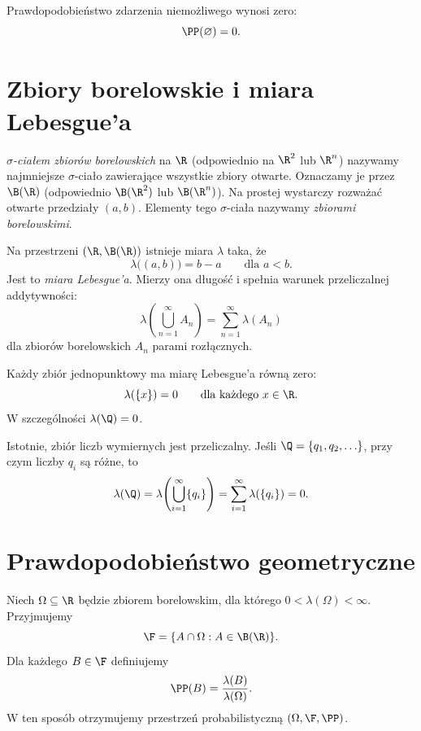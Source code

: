 \begin{fakt}
\label{fakt:pusty}
Prawdopodobieństwo zdarzenia niemożliwego wynosi zero:
\[
  \PP(\varnothing)=0.
\]
\end{fakt}

\section{Zbiory borelowskie i miara Lebesgue'a}
\label{sec:borel}

\begin{definicja}
\emph{$\sigma$-ciałem zbiorów borelowskich} na $\R$
(odpowiednio na $\R^2$ lub $\R^n$) nazywamy najmniejsze
$\sigma$-ciało zawierające wszystkie zbiory otwarte.
Oznaczamy je przez $\B(\R)$ (odpowiednio $\B(\R^2)$ lub $\B(\R^n)$).
Na prostej wystarczy rozważać otwarte przedziały $(a,b)$.
Elementy tego $\sigma$-ciała nazywamy \emph{zbiorami borelowskimi}.
\end{definicja}

Na przestrzeni $(\R,\B(\R))$ istnieje miara $\lambda$ taka, że
\[
  \lambda\bigl((a,b)\bigr)=b-a
  \qquad\text{dla }a<b.
\]
Jest to \emph{miara Lebesgue'a}. Mierzy ona długość i spełnia
warunek przeliczalnej addytywności:
\[
  \lambda\!\left(\bigcup_{n=1}^{\infty}A_n\right)
    =\sum_{n=1}^{\infty}\lambda(A_n)
\]
dla zbiorów borelowskich $A_n$ parami rozłącznych.

\begin{fakt}
\label{fakt:miara-zero}
Każdy zbiór jednopunktowy ma miarę Lebesgue'a równą zero:
\[
  \lambda(\{x\})=0\qquad\text{dla każdego }x\in\R.
\]
W szczególności $\lambda(\Q)=0$.
\end{fakt}

Istotnie, zbiór liczb wymiernych jest przeliczalny. Jeśli
$\Q=\{q_1,q_2,\ldots\}$, przy czym liczby $q_i$ są różne, to
\[
  \lambda(\Q)
    =\lambda\!\left(\bigcup_{i=1}^{\infty}\{q_i\}\right)
    =\sum_{i=1}^{\infty}\lambda(\{q_i\})
    =0.
\]

\section{Prawdopodobieństwo geometryczne}
\label{sec:geometryczne}

Niech $\Omega\subseteq\R$ będzie zbiorem borelowskim, dla którego
$0<\lambda(\Omega)<\infty$. Przyjmujemy
\[
  \F=\{A\cap\Omega:A\in\B(\R)\}.
\]
Dla każdego $B\in\F$ definiujemy
\begin{equation}
  \PP(B)=\frac{\lambda(B)}{\lambda(\Omega)}.
  \label{eq:geometryczne}
\end{equation}
W ten sposób otrzymujemy przestrzeń probabilistyczną
$(\Omega,\F,\PP)$.

